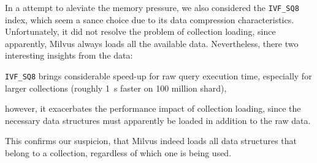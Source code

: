 In a attempt to aleviate the memory pressure, we also considered the \texttt{IVF\_SQ8} index, which seem a sance choice due to its data compression characteristics. Unfortunately, it did not resolve the problem of collection loading, since apparently, Milvus always loads all the available data. Nevertheless, there two interesting insights from the data:
\begin{enumerate*}[label=(\roman*)]
    \item \texttt{IVF\_SQ8} brings considerable speed-up for raw query execution time, especially for larger collections (roughly \SI{1}{\second} faster on 100 million shard),
    \item however, it exacerbates the performance impact of collection loading, since the necessary data structures must apparently be loaded in addition to the raw data.
\end{enumerate*} This confirms our suspicion, that Milvus indeed loads all data structures that belong to a collection, regardless of which one is being used.

